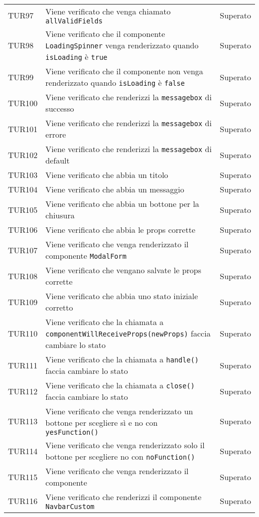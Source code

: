 \documentclass[PianoDiQualifica.tex]{subfiles}
\begin{document}
\begin{longtable}[H]{P{2cm}P{8.5cm}P{3cm}}
	TUR97 & Viene verificato che venga chiamato \texttt{allValidFields} & Superato \\ 
	TUR98 & Viene verificato che il componente \texttt{LoadingSpinner} venga renderizzato quando \texttt{isLoading} è \texttt{true} & Superato \\ 
	TUR99 & Viene verificato che il componente non venga renderizzato quando \texttt{isLoading} è \texttt{false} & Superato \\ 
	TUR100 & Viene verificato che renderizzi la \texttt{messagebox} di successo & Superato \\ 
	TUR101 & Viene verificato che renderizzi la \texttt{messagebox} di errore & Superato \\ 
	TUR102 & Viene verificato che renderizzi la \texttt{messagebox} di default & Superato \\ 
	TUR103 & Viene verificato che abbia un titolo & Superato \\ 
	TUR104 & Viene verificato che abbia un messaggio & Superato \\ 
	TUR105 & Viene verificato che abbia un bottone per la chiusura & Superato \\ 
	TUR106 & Viene verificato che abbia le props corrette & Superato \\ 
	TUR107 & Viene verificato che venga renderizzato il componente \texttt{ModalForm} & Superato \\ 
	TUR108 & Viene verificato che vengano salvate le props corrette & Superato \\ 
	TUR109 & Viene verificato che abbia uno stato iniziale corretto & Superato \\ 
	TUR110 & Viene verificato che la chiamata a \texttt{componentWillReceiveProps(newProps)} faccia cambiare lo stato & Superato \\ 
	TUR111 & Viene verificato che la chiamata a \texttt{handle()} faccia cambiare lo stato & Superato \\ 
	TUR112 & Viene verificato che la chiamata a \texttt{close()} faccia cambiare lo stato & Superato \\ 
	TUR113 & Viene verificato che venga renderizzato un bottone per scegliere sì e no con \texttt{yesFunction()} & Superato \\ 
	TUR114 & Viene verificato che venga renderizzato solo il bottone per scegliere no con \texttt{noFunction()} & Superato \\ 
	TUR115 & Viene verificato che venga renderizzato il componente & Superato \\ 
	TUR116 & Viene verificato che renderizzi il componente \texttt{NavbarCustom}& Superato \\ 

\end{longtable}
\end{document}
